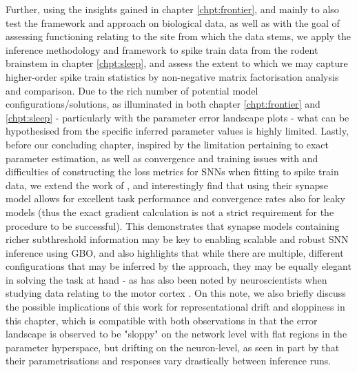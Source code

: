 \documentclass[mphil,deptreport,ianc]{infthesis} %
\begin{document}
Further, using the insights gained in chapter \ref{chpt:frontier}, and mainly to also test the framework and approach on biological data, as well as with the goal of assessing functioning relating to the site from which the data stems, we apply the inference methodology and framework to spike train data from the rodent brainstem in chapter \ref{chpt:sleep}, and assess the extent to which we may capture higher-order spike train statistics by non-negative matrix factorisation analysis and comparison. Due to the rich number of potential model configurations/solutions, as illuminated in both chapter \ref{chpt:frontier} and \ref{chpt:sleep} - particularly with the parameter error landscape plots - what can be hypothesised from the specific inferred parameter values is highly limited.
Lastly, before our concluding chapter, inspired by the limitation pertaining to exact parameter estimation, as well as convergence and training issues with and difficulties of constructing the loss metrics for SNNs when fitting to spike train data, we extend the work of \cite{Huh2018}, and interestingly find that using their synapse model allows for excellent task performance and convergence rates also for leaky models (thus the exact gradient calculation is not a strict requirement for the procedure to be successful). This demonstrates that synapse models containing richer subthreshold information may be key to enabling scalable and robust SNN inference using GBO, and also highlights that while there are multiple, different configurations that may be inferred by the approach, they may be equally elegant in solving the task at hand - as has also been noted by neuroscientists when studying data relating to the motor cortex \cite{Marblestone2016}.
On this note, we also briefly discuss the possible implications of this work for representational drift and sloppiness in this chapter, which is compatible with both observations in that the error landscape is observed to be "sloppy" on the network level with flat regions in the parameter hyperspace, but drifting on the neuron-level, as seen in part by that their parametrisations and responses vary drastically between inference runs.
\end{document}
